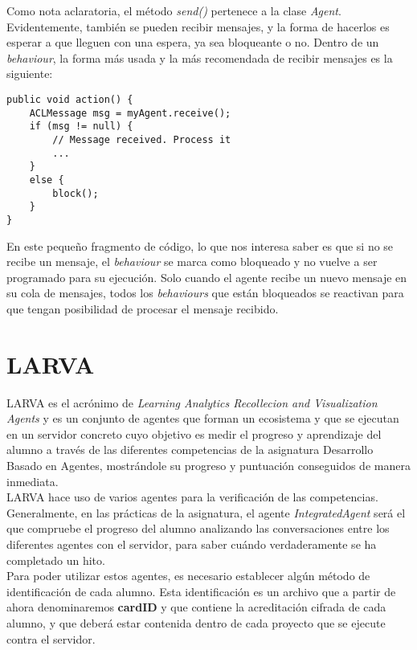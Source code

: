 Como nota aclaratoria, el método \textit{send()} pertenece a la clase \textit{Agent}.\\

Evidentemente, también se pueden recibir mensajes, y la forma de hacerlos es esperar a que lleguen con una espera, ya sea bloqueante o no. Dentro de un \textit{behaviour}, la forma más usada y la más recomendada de recibir mensajes es la siguiente:\\

\begin{lstlisting}
public void action() {
    ACLMessage msg = myAgent.receive();
    if (msg != null) {
        // Message received. Process it
        ...
    }
    else {
        block();
    }
}
\end{lstlisting}

En este pequeño fragmento de código, lo que nos interesa saber es que si no se recibe un mensaje, el \textit{behaviour} se marca como bloqueado y no vuelve a ser programado para su ejecución. Solo cuando el agente recibe un nuevo mensaje en su cola de mensajes, todos los \textit{behaviours} que están bloqueados se reactivan para que tengan posibilidad de procesar el mensaje recibido.

\section{LARVA}

LARVA es el acrónimo de \textit{Learning Analytics Recollecion and Visualization Agents} y es un conjunto de agentes que forman un ecosistema y que se ejecutan en un servidor concreto cuyo objetivo es medir el progreso y aprendizaje del alumno a través de las diferentes competencias de la asignatura Desarrollo Basado en Agentes, mostrándole su progreso y puntuación conseguidos de manera inmediata.\\

LARVA hace uso de varios agentes para la verificación de las competencias. Generalmente, en las prácticas de la asignatura, el agente \textit{IntegratedAgent} será el que compruebe el progreso del alumno analizando las conversaciones entre los diferentes agentes con el servidor, para saber cuándo verdaderamente se ha completado un hito.\\

Para poder utilizar estos agentes, es necesario establecer algún método de identificación de cada alumno. Esta identificación es un archivo que a partir de ahora denominaremos \textbf{cardID} y que contiene la acreditación cifrada de cada alumno, y que deberá estar contenida dentro de cada proyecto que se ejecute contra el servidor.